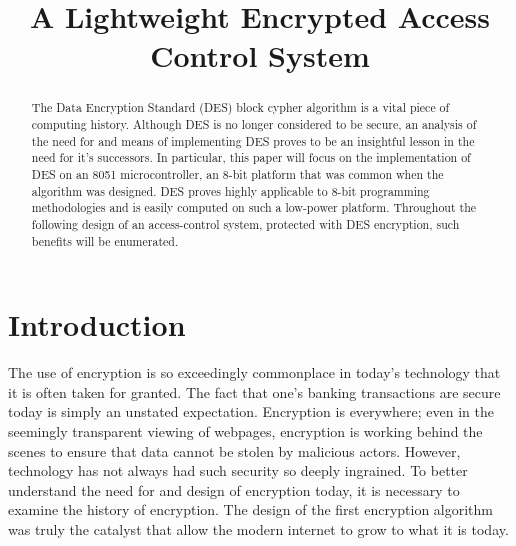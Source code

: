 \documentclass[conference]{IEEEtran}
\begin{document}
\title{A Lightweight Encrypted Access Control System}
\author{
}

\maketitle

\begin{flushright}\end{flushright}
\begin{abstract}
The Data Encryption Standard (DES) block cypher algorithm is a vital piece of computing history. Although DES is no longer considered to be secure, an analysis of the need for and means of implementing DES proves to be an insightful lesson in the need for it's successors. In particular, this paper will focus on the implementation of DES on an 8051 microcontroller, an 8-bit platform that was common when the algorithm was designed. DES proves highly applicable to 8-bit programming methodologies and is easily computed on such a low-power platform. Throughout the following design of an access-control system, protected with DES encryption, such benefits will be enumerated.
\end{abstract}

\section{Introduction}
The use of encryption is so exceedingly commonplace in today's technology that it is often taken for granted. The fact that one's banking transactions are secure today is simply an unstated expectation. Encryption is everywhere; even in the seemingly transparent viewing of webpages, encryption is working behind the scenes to ensure that data cannot be stolen by malicious actors. However, technology has not always had such security so deeply ingrained. To better understand the need for and design of encryption today, it is necessary to examine the history of encryption. The design of the first encryption algorithm was truly the catalyst that allow the modern internet to grow to what it is today.
\end{document}
